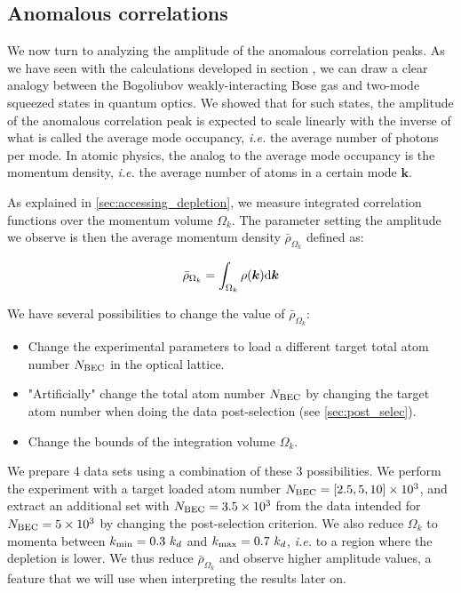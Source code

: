 \subsection{Anomalous correlations}

We now turn to analyzing the amplitude of the anomalous correlation peaks. As we have seen with the calculations developed in section , we can draw a clear analogy between the Bogoliubov weakly-interacting Bose gas and two-mode squeezed states in quantum optics. We showed that for such states, the amplitude of the anomalous correlation peak is expected to scale linearly with the inverse of what is called the average mode occupancy, {\it i.e.} the average number of photons per mode. In atomic physics, the analog to the average mode occupancy is the momentum density, {\it i.e.} the average number of atoms in a certain mode $\bm{k}$.

As explained in \ref{sec:accessing_depletion}, we measure integrated correlation functions over the momentum volume $\Omega_k$. The parameter setting the amplitude we observe is then the average momentum density $\bar{\rho}_{\Omega_k}$ defined as:

\begin{equation}
    \bar{\rho}_{\Omega_k}=\int_{\Omega_{k}} \rho({\bm k}) {\rm d}{\bm k}
\end{equation}

We have several possibilities to change the value of $\bar{\rho}_{\Omega_k}$:

\begin{itemize}
    \item Change the experimental parameters to load a different target total atom number $N_{\rm{BEC}}$ in the optical lattice.
    \item "Artificially" change the total atom number $N_{\rm{BEC}}$ by changing the target atom number when doing the data post-selection (see \ref{sec:post_selec}).
    \item Change the bounds of the integration volume $\Omega_k$.
\end{itemize}

We prepare 4 data sets using a combination of these 3 possibilities. We perform the experiment with a target loaded atom number $N_{\rm{BEC}}=[2.5,5,10] \times 10^3$, and extract an additional set with $N_{\rm{BEC}}=3.5 \times 10^3$ from the data intended for $N_{\rm{BEC}} = 5 \times 10^3$ by changing the post-selection criterion. We also reduce $\Omega_k$ to momenta between $k_{\rm{min}} = 0.3 \ k_d$ and $k_{\rm{max}} = 0.7 \ k_d$, {\it i.e.} to a region where the depletion is lower. We thus reduce $\bar{\rho}_{\Omega_k}$ and observe higher amplitude values, a feature that we will use when interpreting the results later on.

